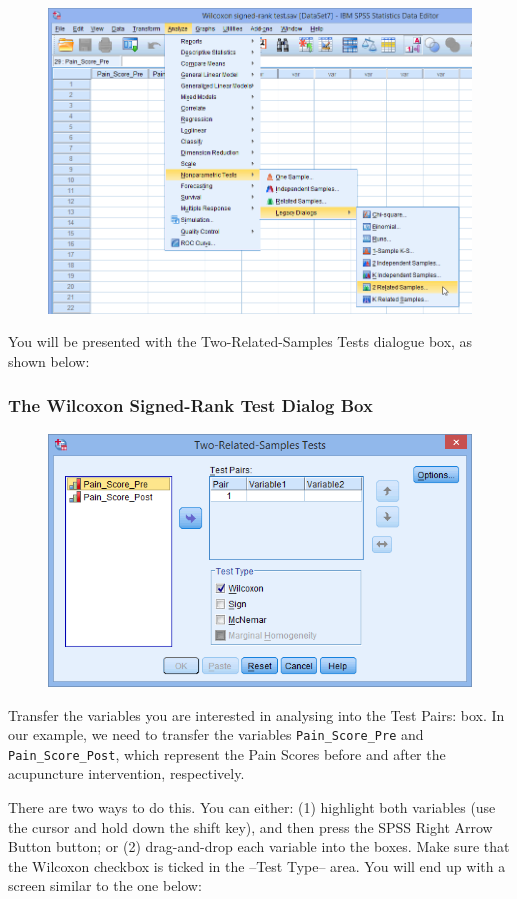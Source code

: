 \documentclass[]{article}
\begin{document}
\begin{figure}
\centering
\includegraphics[width=0.7\linewidth]{images/wilcoxon-signed-rank-test-1}
\end{figure}


You will be presented with the Two-Related-Samples Tests dialogue box, as shown below:


\subsubsection*{The Wilcoxon Signed-Rank Test Dialog Box}
\begin{figure}
\centering
\includegraphics[width=0.7\linewidth]{images/wilcoxon-signed-rank-test-2}
\caption{}
\label{fig:wilcoxon-signed-rank-test-2}
\end{figure}

Transfer the variables you are interested in analysing into the Test Pairs: box. In our example, we need to transfer the variables \texttt{Pain\_Score\_Pre} and \texttt{Pain\_Score\_Post}, which represent the Pain Scores before and after the acupuncture intervention, respectively. 

There are two ways to do this. You can either: (1) highlight both variables (use the cursor and hold down the shift key), and then press the SPSS Right Arrow Button button; or (2) drag-and-drop each variable into the boxes. Make sure that the Wilcoxon checkbox is ticked in the –Test Type– area. You will end up with a screen similar to the one below:
\end{document}
